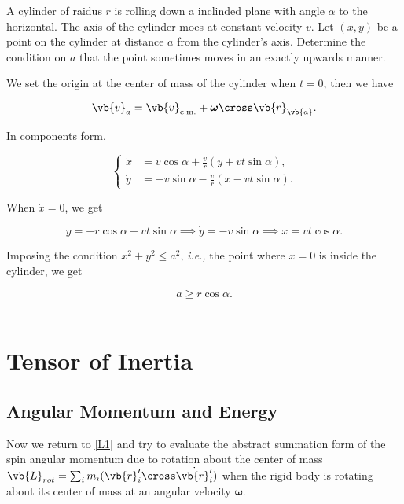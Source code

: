 \documentclass[a4paper,12pt]{report}
\begin{document}
{A cylinder of raidus \(r\) is rolling down a inclinded plane with angle \(\alpha \) to the horizontal. The axis of the cylinder moes at constant velocity \(v\). Let \((x,y)\) be a point on the cylinder at distance \(a\) from the cylinder's axis. Determine the condition on \(a\) that the point sometimes moves in an exactly upwards manner.}
{We set the origin at the center of mass of the cylinder when \(t = 0\), then we have 

\begin{equation}
	\vb{v} _{a} = \vb{v} _{\text{c.m.} } + \boldsymbol{\omega } \cross \vb{r} _{\vb{a} }.   
\end{equation}

In components form,

\begin{equation}
	\begin{cases}
		\dot{x} &= v\cos \alpha  + \frac{v}{r} (y+vt\sin \alpha ),\\
		\dot{y} &= -v\sin \alpha - \frac{v}{r} (x-vt\sin \alpha ).
	\end{cases}
\end{equation}

When \(\dot{x} = 0\), we get 

\begin{equation}
	y = -r \cos \alpha - vt\sin \alpha \implies \dot{y} = -v\sin \alpha \implies x = vt \cos \alpha .
\end{equation}

Imposing the condition \(x^2+y^2 \le a^2\), \textit{i.e.,} the point where \(\dot{x} = 0\) is inside the cylinder, we get 

\begin{equation}
	a \ge r\cos \alpha .
\end{equation}
~
} 


\section{Tensor of Inertia}

\subsection{Angular Momentum and Energy}


Now we return to \cref{L1} and try to evaluate the abstract summation form of the spin angular momentum due to rotation about the center of mass \(\vb{L} _{rot} = \sum_{i}^{} m_{i} (\vb{r} '_{i} \cross \dot{\vb{r} '_{i} } )  \) when the rigid body is rotating about its center of mass at an angular velocity \(\boldsymbol{\omega } \).
\end{document}
